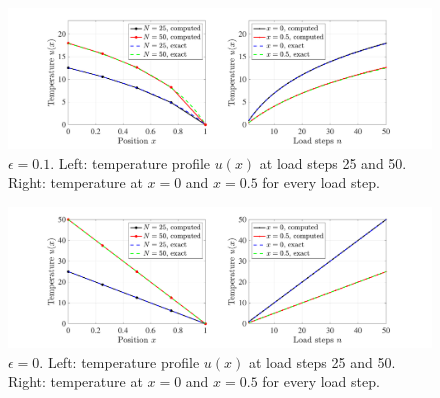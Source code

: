 \clearpage
\begin{figure}[!ht]
    \centering
    \includegraphics[width=\linewidth]{homework/hw2/hw2_eps_0pt1.pdf}
    \caption{$\epsilon = 0.1$. Left: temperature profile $u(x)$ at load steps 25 and 50. Right: temperature at $x = 0$ and $x = 0.5$ for every load step.}
    \label{fig:hw2_p2_c}
\end{figure}

\begin{figure}[!ht]
    \centering
    \includegraphics[width=\linewidth]{homework/hw2/hw2_eps_0.pdf}
    \caption{$\epsilon = 0$. Left: temperature profile $u(x)$ at load steps 25 and 50. Right: temperature at $x = 0$ and $x = 0.5$ for every load step.}
    \label{fig:hw2_p2_d}
\end{figure}